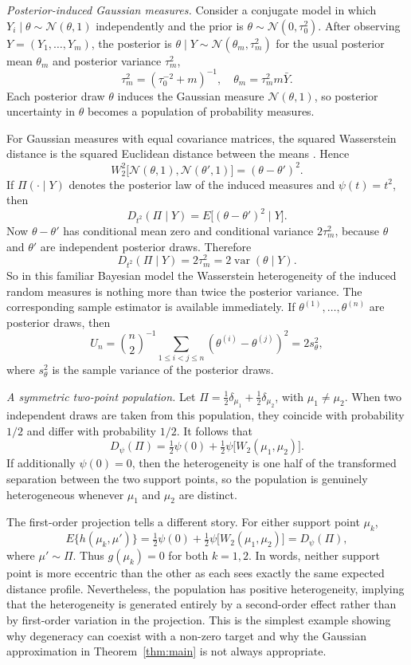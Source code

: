 \documentclass[10pt]{article}
\DeclareMathOperator{\varop}{var}
\newcommand{\W}{W_2}
\begin{document}
\smallskip\noindent\textit{Posterior-induced Gaussian measures.}
Consider a conjugate model in which $Y_i\mid\theta\sim \mathcal{N}(\theta,1)$ independently and the prior is $\theta\sim \mathcal{N}(0,\tau_0^2)$. After observing $Y=(Y_1,\ldots,Y_m)$, the posterior is $\theta\mid Y\sim \mathcal{N}(\theta_m,\tau_m^2)$ for the usual posterior mean $\theta_m$ and posterior variance $\tau_m^2$,
\[
\tau_m^2=(\tau_0^{-2}+m)^{-1},\quad
\theta_m=\tau_m^2 m\bar Y .
\]
Each posterior draw $\theta$ induces the Gaussian measure $\mathcal{N}(\theta,1)$, so posterior uncertainty in $\theta$ becomes a population of probability measures.

For Gaussian measures with equal covariance matrices, the squared Wasserstein distance is the squared Euclidean distance between the means \citep{takatsu_2011_WassersteinGeometryGaussian}. Hence
\[
\W^2\bigl[\mathcal{N}(\theta,1),\mathcal{N}(\theta',1)\bigr]=(\theta-\theta')^2.
\]
If $\Pi(\cdot\mid Y)$ denotes the posterior law of the induced measures and $\psi(t)=t^2$, then
\[
D_{t^2}(\Pi\mid Y)=E\bigl[(\theta-\theta')^2\mid Y\bigr].
\]
Now $\theta-\theta'$ has conditional mean zero and conditional variance $2\tau_m^2$, because $\theta$ and $\theta'$ are independent posterior draws. Therefore
\[
D_{t^2}(\Pi\mid Y)=2\tau_m^2=2\varop(\theta\mid Y).
\]
So in this familiar Bayesian model the Wasserstein heterogeneity of the induced random measures is nothing more than twice the posterior variance. The corresponding sample estimator is available immediately. If $\theta^{(1)},\ldots,\theta^{(n)}$ are posterior draws, then
\[
U_n=\binom{n}{2}^{-1}\sum_{1\leq i<j\leq n}(\theta^{(i)}-\theta^{(j)})^2=2s_{\theta}^2,
\]
where $s_{\theta}^2$ is the sample variance of the posterior draws.

\smallskip\noindent\textit{A symmetric two-point population.}
Let $\Pi=\tfrac{1}{2}\delta_{\mu_1}+\tfrac{1}{2}\delta_{\mu_2}$, with $\mu_1\neq\mu_2$. When two independent draws are taken from this population, they coincide with probability $1/2$ and differ with probability $1/2$. It follows that
\[
D_{\psi}(\Pi)=\tfrac{1}{2}\psi(0)+\tfrac{1}{2}\psi\bigl[\W(\mu_1,\mu_2)\bigr].
\]
If additionally $\psi(0)=0$, then the heterogeneity is one half of the transformed separation between the two support points, so the population is genuinely heterogeneous whenever $\mu_1$ and $\mu_2$ are distinct.

The first-order projection tells a different story. For either support point $\mu_k$,
\[
E\{h(\mu_k,\mu')\}=\tfrac{1}{2}\psi(0)+\tfrac{1}{2}\psi\bigl[\W(\mu_1,\mu_2)\bigr]=D_{\psi}(\Pi),
\]
where $\mu'\sim\Pi$. Thus $g(\mu_k)=0$ for both $k=1,2$. In words, neither support point is more eccentric than the other as each sees exactly the same expected distance profile. Nevertheless, the population has positive heterogeneity, implying that the heterogeneity is generated entirely by a second-order effect rather than by first-order variation in the projection. This is the simplest example showing why degeneracy can coexist with a non-zero target and why the Gaussian approximation in Theorem~\ref{thm:main} is not always appropriate.
\end{document}
